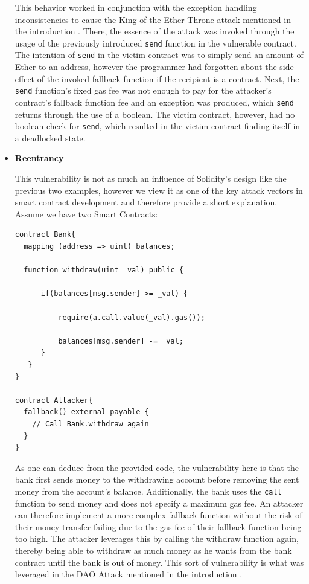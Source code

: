 \documentclass[letterpaper,twocolumn,10pt]{article}
\begin{document}
\begin{itemize}
  This behavior worked in conjunction with the exception handling inconsistencies to cause the King of the Ether Throne attack mentioned in the introduction \cite{atzei_bartoletti_cimoli_2017}. There, the essence of the attack was invoked through the usage of the previously introduced \verb|send| function in the vulnerable contract. The intention of \verb|send| in the victim contract was to simply send an amount of Ether to an address, however the programmer had forgotten about the side-effect of the invoked fallback function if the recipient is a contract. Next, the \verb|send| function's fixed gas fee was not enough to pay for the attacker's contract's fallback function fee and an exception was produced, which \verb|send| returns through the use of a boolean. The victim contract, however, had no boolean check for \verb|send|, which resulted in the victim contract finding itself in a deadlocked state.

    \item \textbf{Reentrancy}


    This vulnerability is not as much an influence of Solidity's design like the previous two examples, however we view it as one of the key attack vectors in smart contract development and therefore provide a short explanation. Assume we have two Smart Contracts:

  \begin{verbatim}
contract Bank{
  mapping (address => uint) balances;

  function withdraw(uint _val) public {

      if(balances[msg.sender] >= _val) {

          require(a.call.value(_val).gas());

	      balances[msg.sender] -= _val;
      }
   }
}

contract Attacker{
  fallback() external payable {
    // Call Bank.withdraw again
  }
}
  \end{verbatim}

As one can deduce from the provided code, the vulnerability here is that the bank first sends money to the withdrawing account before removing the sent money from the account's balance. Additionally, the bank uses the \verb|call| function to send money and does not specify a maximum gas fee. An attacker can therefore implement a more complex fallback function without the risk of their money transfer failing due to the gas fee of their fallback function being too high. The attacker leverages this by calling the withdraw function again, thereby being able to withdraw as much money as he wants from the bank contract until the bank is out of money. This sort of vulnerability is what was leveraged in the DAO Attack mentioned in the introduction \cite{atzei_bartoletti_cimoli_2017}.


\end{itemize}
\end{document}
